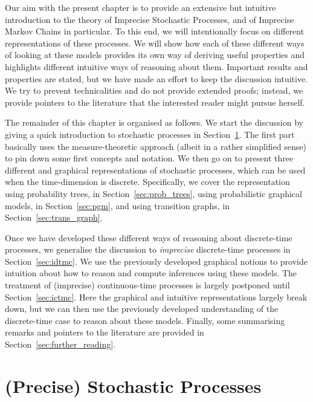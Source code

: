 \documentclass[graybox]{svmult}
\begin{document}
Our aim with the present chapter is to provide an extensive but intuitive introduction to the theory of Imprecise Stochastic Processes, and of Imprecise Markov Chains in particular. To this end, we will intentionally focus on different representations of these processes. We will show how each of these different ways of looking at these models provides its own way of deriving useful properties and highlights different intuitive ways of reasoning about them. Important results and properties are stated, but we have made an effort to keep the discussion intuitive. We try to prevent technicalities and do not provide extended proofs; instead, we provide pointers to the literature that the interested reader might pursue herself.

The remainder of this chapter is organised as follows. We start the discussion by giving a quick introduction to stochastic processes in Section~\ref{sec:prec_stoch_proc}. The first part basically uses the measure-theoretic approach (albeit in a rather simplified sense) to pin down some first concepts and notation. We then go on to present three different and graphical representations of stochastic processes, which can be used when the time-dimension is discrete. Specifically, we cover the representation using probability trees, in Section~\ref{sec:prob_trees}, using probabilistic graphical models, in Section~\ref{sec:pgm}, and using transition graphs, in Section~\ref{sec:trans_graph}.

Once we have developed these different ways of reasoning about discrete-time processes, we generalise the discussion to \emph{imprecise} discrete-time processes in Section~\ref{sec:idtmc}. We use the previously developed graphical notions to provide intuition about how to reason and compute inferences using these models. The treatment of (imprecise) continuous-time processes is largely postponed until Section~\ref{sec:ictmc}. Here the graphical and intuitive representations largely break down, but we can then use the previously developed understanding of the discrete-time case to reason about these models. Finally, some summarising remarks and pointers to the literature are provided in Section~\ref{sec:further_reading}.

\section{(Precise) Stochastic Processes}\label{sec:prec_stoch_proc}
\end{document}
